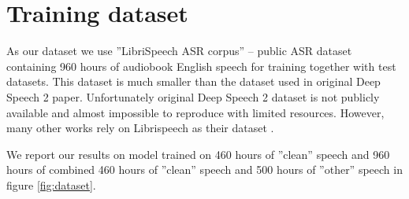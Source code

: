 \documentclass[licencjacka,en]{pracamgr}
\begin{document}
    
    \section{Training dataset}
	As our dataset we use ''LibriSpeech ASR corpus'' \cite{DATA} -- public ASR dataset containing 960 hours of audiobook English speech for training together with test datasets. This dataset is much smaller than the dataset used in original Deep Speech 2 paper. Unfortunately original Deep Speech 2 dataset is not publicly available and almost impossible to reproduce with limited resources. However, many other works rely on Librispeech as their dataset \cite{LIBRI-EX}.
	
	We report our results on model trained on 460 hours of ''clean'' speech and 960 hours of combined 460 hours of ''clean'' speech and 500 hours of ''other'' speech in figure \ref{fig:dataset}.
	
	\clean
	
\end{document}
